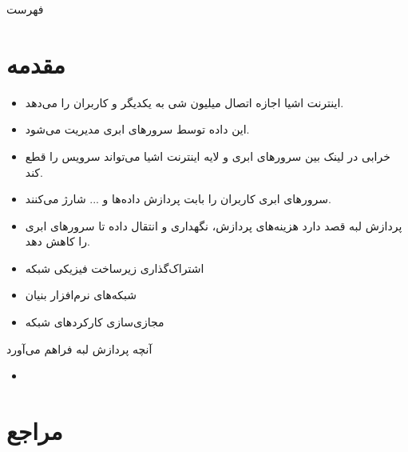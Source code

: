 \documentclass{beamer}
\makeatletter
\newcommand{\RTList}{\raggedleft\rightskip\@totalleftmargin}
\makeatother
\begin{document}
\begin{persian}
{%
  \begin{frame}
    \titlepage%
  \end{frame}
}

\begin{frame}{فهرست}
  \tableofcontents[pausesections]
\end{frame}

\section{مقدمه}

\begin{frame}{}
  \begin{itemize}\RTList
    \justifying
    \item اینترنت اشیا اجازه اتصال میلیون شی به یکدیگر و کاربران را می‌دهد.
    \item این داده توسط سرورهای ابری مدیریت می‌شود.
    \item خرابی در لینک بین سرورهای ابری و لایه اینترنت اشیا می‌تواند سرویس را قطع کند.
    \item سرورهای ابری کاربران را بابت پردازش داده‌ها و ... شارژ می‌کنند.
    \item پردازش لبه قصد دارد هزینه‌های پردازش، نگهداری و انتقال داده تا سرورهای ابری را کاهش دهد.
  \end{itemize}
\end{frame}

\begin{frame}{}
  \begin{itemize}\RTList
    \justifying
    \item اشتراک‌گذاری زیرساخت فیزیکی شبکه
    \item شبکه‌های نرم‌افزار بنیان
    \item مجازی‌سازی کارکردهای شبکه
  \end{itemize}
\end{frame}

\begin{frame}{آنچه پردازش لبه فراهم می‌آورد}
  \begin{itemize}\RTList
    \item 
  \end{itemize}
\end{frame}

\section{مراجع}

\begin{frame}{}
  \printbibliography%
\end{frame}

\end{persian}
\end{document}
